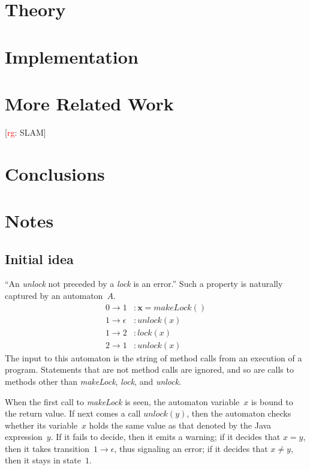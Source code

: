 \documentclass[a4paper]{article}
\newcommand{\rg}[1]{\todo{rg}{#1}}
\newcommand{\todo}[2]{{\small [\textcolor{red}{#1}: #2]}}
\theoremstyle{slanted}
\theoremstyle{definition}
\theoremstyle{remark}
\begin{document}
\section{Theory}

\section{Implementation}

\section{More Related Work}

\rg{SLAM}

\section{Conclusions}

\section{Notes}

\subsection{Initial idea}

``An \textit{unlock} not preceded by a \textit{lock} is an error.''
Such a property is naturally captured by an automaton~$A$.
\begin{equation}
\begin{aligned}
0\to1&: \mathbf{x} = \mathit{makeLock}()\\
1\to\epsilon&: \mathit{unlock}(x)\\
1\to2&: \mathit{lock}(x)\\
2\to1&: \mathit{unlock}(x)
\end{aligned}
\end{equation}
The input to this automaton is the string of method calls from an execution of a program.
Statements that are not method calls are ignored, and so are calls to methods other than \textit{makeLock}, \textit{lock}, and \textit{unlock}.

When the first call to \textit{makeLock} is seen, the automaton variable~$x$ is bound to the return value.
If next comes a call $\mathit{unlock}(y)$, then the automaton checks whether its variable~$x$ holds the same value as that denoted by the Java expression~$y$.
If it fails to decide, then it emits a warning; if it decides that $x=y$, then it takes transition~$1\to\epsilon$, thus signaling an error; if it decides that $x\ne y$, then it stays in state~$1$.
\end{document}
